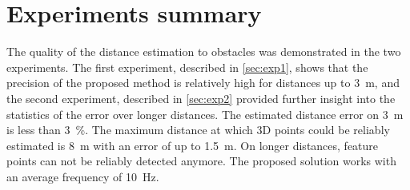 \section{Experiments summary}
The quality of the distance estimation to obstacles was demonstrated in the two experiments.
The first experiment, described in \autoref{sec:exp1}, shows that the precision of the proposed method is relatively high for distances up to \SI{3}{\meter}, and the second experiment, described in \autoref{sec:exp2} provided further insight into the statistics of the error over longer distances. 
The estimated distance error on \SI{3}{\meter} is less than \qty{3}{\percent}.
The maximum distance at which 3D points could be reliably estimated is \SI{8}{\meter} with an error of up to \SI{1.5}{\meter}.
On longer distances, feature points can not be reliably detected anymore.
The proposed solution works with an average frequency of \SI{10}{\hertz}.
